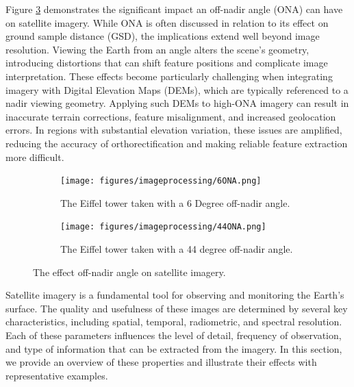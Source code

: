 \noindent
Figure \ref{fig:OffImg} \cite{EUSI} demonstrates the significant impact an off-nadir angle (ONA) can have on satellite imagery. While ONA is often discussed in 
relation to its effect on ground sample distance (GSD), the implications extend well beyond image resolution. Viewing the Earth from an angle alters the scene's geometry, 
introducing distortions that can shift feature positions and complicate image interpretation. These effects become particularly challenging when integrating imagery 
with Digital Elevation Maps (DEMs), which are typically referenced to a nadir viewing geometry. Applying such DEMs to high-ONA imagery can result in inaccurate 
terrain corrections, feature misalignment, and increased geolocation errors. In regions with substantial elevation variation, these issues are amplified, reducing 
the accuracy of orthorectification and making reliable feature extraction more difficult.


\begin{figure}[H]
    \centering
    \begin{subfigure}[b]{0.48\linewidth}
        \centering
        \texttt{[image: figures/imageprocessing/6ONA.png]}
        \caption{The Eiffel tower taken with a 6 Degree off-nadir angle.}
        \label{fig:ONA1}
    \end{subfigure}
    \hfill
    \begin{subfigure}[b]{0.48\linewidth}
        \centering
        \texttt{[image: figures/imageprocessing/44ONA.png]} %
        \caption{The Eiffel tower taken with a 44 degree off-nadir angle.}
        \label{fig:ONA2}
    \end{subfigure}
    \caption{The effect off-nadir angle on satellite imagery.}
    \label{fig:OffImg}
\end{figure}



Satellite imagery is a fundamental tool for observing and monitoring the Earth's surface. The quality and usefulness of these images are determined by several key characteristics, including spatial, temporal, radiometric, and spectral resolution. Each of these parameters influences the level of detail, frequency of observation, and type of information that can be extracted from the imagery. In this section, we provide an overview of these properties and illustrate their effects with representative examples.

